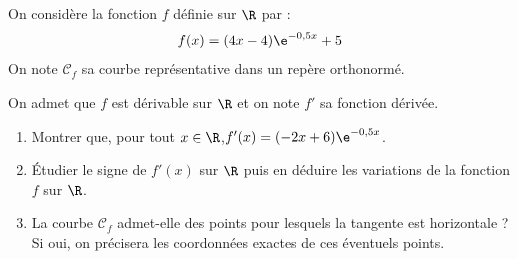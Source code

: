 On considère la fonction $f$ définie sur $\R$ par :
\[f(x)=(4 x-4) \e^{-0,5 x}+5\]
On note $\mathcal{C}_{f}$ sa courbe représentative dans un repère orthonormé.

On admet que $f$ est dérivable sur $\R$ et on note $f'$ sa fonction dérivée.

\begin{enumerate}
	\item Montrer que, pour tout $x \in \R$,\quad $f'(x)=(-2 x+6) \e^{-0,5 x}$.

	\item Étudier le signe de $f'(x)$ sur $\R$ puis en déduire les variations de la fonction $f$ sur $\R$.

	\item La courbe $\mathcal{C}_{f}$ admet-elle des points pour lesquels la tangente est horizontale ? Si oui, on précisera les coordonnées exactes de ces éventuels points.
\end{enumerate}
